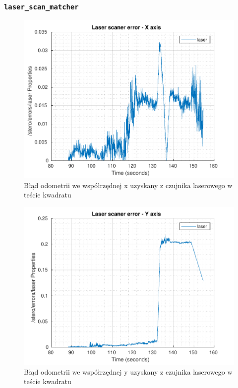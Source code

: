 \documentclass{mwrep}
\begin{document}
\subsubsection{\texttt{laser\_{}scan\_{}matcher}}
\label{pro1_figures_square_laser}
\begin{figure}[H]
	\centering
	\includegraphics[scale=0.85]{./figures/pro1/square_tune/square_tune_laser_x.pdf}
	\caption{Błąd odometrii we współrzędnej x uzyskany z czujnika laserowego w teście kwadratu}
\end{figure}

\begin{figure}[H]
	\centering
	\includegraphics[scale=0.85]{./figures/pro1/square_tune/square_tune_laser_y.pdf}
	\caption{Błąd odometrii we współrzędnej y uzyskany z czujnika laserowego w teście kwadratu}
\end{figure}
\end{document}
